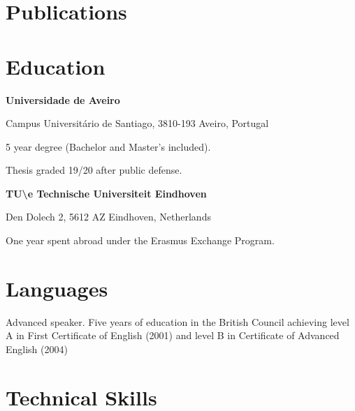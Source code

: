 \section*{Publications}



\section*{Education}


{
\textbf{Universidade de Aveiro}

Campus Universitário de Santiago, 3810-193 Aveiro, Portugal
}


{
5 year degree (Bachelor and Master's included).

Thesis graded 19/20 after public defense. 
}


\vspace{\baselineskip}


{
\textbf{TU\textbackslash e Technische Universiteit Eindhoven}

Den Dolech 2, 5612 AZ Eindhoven, Netherlands
}

{
One year spent abroad under the Erasmus Exchange Program.
}


\section*{Languages}


{
Advanced speaker. Five years of education in the British Council achieving
level A in First Certificate of English (2001) and level B in Certificate of
Advanced English (2004)
}



\section*{Technical Skills}

